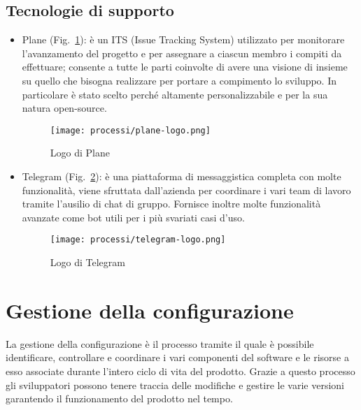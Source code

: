\subsection{Tecnologie di supporto}
\begin{itemize}
    \item Plane (Fig.~\ref{fig:logo-plane}): è un ITS (Issue Tracking System) utilizzato per monitorare l'avanzamento del progetto e per assegnare a ciascun membro i compiti da effettuare; consente a tutte le parti coinvolte di avere una visione di insieme su quello che bisogna realizzare per portare a compimento lo sviluppo. In particolare è stato scelto perché altamente personalizzabile e per la sua natura open-source.
    
    \begin{figure}[!h] 
        \centering 
        \texttt{[image: processi/plane-logo.png]} 
        \caption{Logo di Plane}
        \label{fig:logo-plane}
      \end{figure}

    \item Telegram (Fig.~\ref{fig:logo-telegram}): è una piattaforma di messaggistica completa con molte funzionalità, viene sfruttata dall'azienda per coordinare i vari team di lavoro tramite l'ausilio di chat di gruppo. Fornisce inoltre molte funzionalità avanzate come bot utili per i più svariati casi d'uso.
    
    \begin{figure}[!h] 
        \centering 
        \texttt{[image: processi/telegram-logo.png]} 
        \caption{Logo di Telegram}
        \label{fig:logo-telegram}
      \end{figure}
\end{itemize}

\section{Gestione della configurazione}
La gestione della configurazione è il processo tramite il quale è possibile identificare, controllare e coordinare i vari componenti del software e le risorse a esso associate durante l'intero ciclo di vita del prodotto. Grazie a questo processo gli sviluppatori possono tenere traccia delle modifiche e gestire le varie versioni garantendo il funzionamento del prodotto nel tempo.

